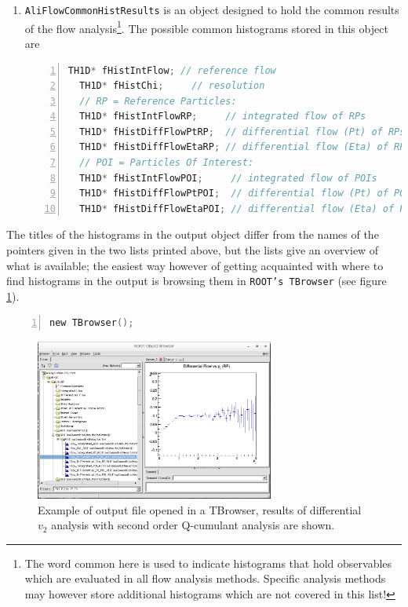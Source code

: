 \documentclass[a4paper]{book}
\numberwithin{equation}{subsection}
\begin{document}
\begin{enumerate}
  \item \texttt{AliFlowCommonHistResults} is an object designed to hold the common results of the flow analysis\footnote{The word common here is used to indicate histograms that hold observables which are evaluated in all flow analysis methods. Specific analysis methods may however store additional histograms which are not covered in this list!}. The possible common histograms stored in this object are
  \begin{lstlisting}[language=C, numbers=left]
  TH1D* fHistIntFlow; // reference flow
  TH1D* fHistChi;     // resolution
  // RP = Reference Particles:  
  TH1D* fHistIntFlowRP;     // integrated flow of RPs
  TH1D* fHistDiffFlowPtRP;  // differential flow (Pt) of RPs
  TH1D* fHistDiffFlowEtaRP; // differential flow (Eta) of RPs
  // POI = Particles Of Interest:
  TH1D* fHistIntFlowPOI;     // integrated flow of POIs
  TH1D* fHistDiffFlowPtPOI;  // differential flow (Pt) of POIs
  TH1D* fHistDiffFlowEtaPOI; // differential flow (Eta) of POIs \end{lstlisting}
  
  \end{enumerate}
  The titles of the histograms in the output object differ from the names of the pointers given in the two lists printed above, but the lists give an overview of what is available; the easiest way however of getting acquainted with where to find histograms in the output is browsing them in \texttt{ROOT's TBrowser} (see figure \ref{fig:browserExample}).
  \begin{lstlisting}[language=C, numbers=left]
  new TBrowser(); \end{lstlisting}
\begin{figure}
 \includegraphics[width=0.70\textwidth]{figs/browserExample.png}
 \caption[TBrowser with output file]{Example of output file opened in a TBrowser, results of differential $v_2$ analysis with second order Q-cumulant analysis are shown.}
 \label{fig:browserExample}
\end{figure}
\end{document}
